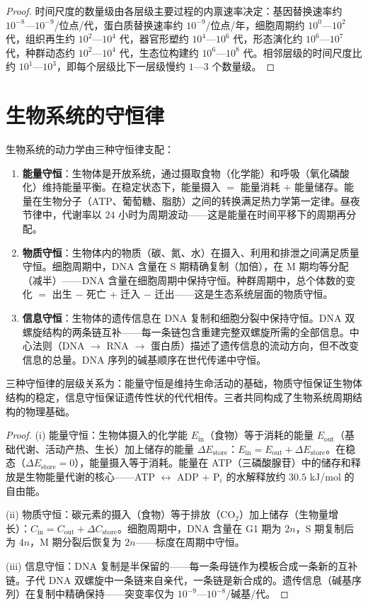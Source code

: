 \begin{proof}
时间尺度的数量级由各层级主要过程的内禀速率决定：基因替换速率约 $10^{-8}$—$10^{-9}$/位点/代，蛋白质替换速率约 $10^{-9}$/位点/年，细胞周期约 $10^0$—$10^2$ 代，组织再生约 $10^2$—$10^4$ 代，器官形塑约 $10^4$—$10^6$ 代，形态演化约 $10^6$—$10^7$ 代，种群动态约 $10^2$—$10^4$ 代，生态位构建约 $10^6$—$10^8$ 代。相邻层级的时间尺度比约 $10^1$—$10^3$，即每个层级比下一层级慢约 $1$—$3$ 个数量级。
\end{proof}

\section{生物系统的守恒律}

\begin{theorem}[生物系统的三种守恒律]\label{thm:biological_conservation}
生物系统的动力学由三种守恒律支配：
\begin{enumerate}[label=(\roman*)]
    \item \textbf{能量守恒}：生物体是开放系统，通过摄取食物（化学能）和呼吸（氧化磷酸化）维持能量平衡。在稳定状态下，能量摄入 $=$ 能量消耗 $+$ 能量储存。能量在生物分子（ATP、葡萄糖、脂肪）之间的转换满足热力学第一定律。昼夜节律中，代谢率以 $24$ 小时为周期波动——这是能量在时间平移下的周期再分配。
    \item \textbf{物质守恒}：生物体内的物质（碳、氮、水）在摄入、利用和排泄之间满足质量守恒。细胞周期中，DNA 含量在 S 期精确复制（加倍），在 M 期均等分配（减半）——DNA 含量在细胞周期中保持守恒。种群周期中，总个体数的变化 $=$ 出生 $-$ 死亡 $+$ 迁入 $-$ 迁出——这是生态系统层面的物质守恒。
    \item \textbf{信息守恒}：生物体的遗传信息在 DNA 复制和细胞分裂中保持守恒。DNA 双螺旋结构的两条链互补——每一条链包含重建完整双螺旋所需的全部信息。中心法则（DNA $\to$ RNA $\to$ 蛋白质）描述了遗传信息的流动方向，但不改变信息的总量。DNA 序列的碱基顺序在世代传递中守恒。
\end{enumerate}
三种守恒律的层级关系为：能量守恒是维持生命活动的基础，物质守恒保证生物体结构的稳定，信息守恒保证遗传性状的代代相传。三者共同构成了生物系统周期结构的物理基础。
\end{theorem}

\begin{proof}
(i) 能量守恒：生物体摄入的化学能 $E_{\text{in}}$（食物）等于消耗的能量 $E_{\text{out}}$（基础代谢、活动产热、生长）加上储存的能量 $\Delta E_{\text{store}}$：$E_{\text{in}} = E_{\text{out}} + \Delta E_{\text{store}}$。在稳态（$\Delta E_{\text{store}} = 0$），能量摄入等于消耗。能量在 ATP（三磷酸腺苷）中的储存和释放是生物能量代谢的核心——ATP $\leftrightarrow$ ADP $+$ P$_i$ 的水解释放约 $30.5$ kJ/mol 的自由能。

(ii) 物质守恒：碳元素的摄入（食物）等于排放（CO$_2$）加上储存（生物量增长）：$C_{\text{in}} = C_{\text{out}} + \Delta C_{\text{store}}$。细胞周期中，DNA 含量在 G1 期为 $2n$，S 期复制后为 $4n$，M 期分裂后恢复为 $2n$——标度在周期中守恒。

(iii) 信息守恒：DNA 复制是半保留的——每一条母链作为模板合成一条新的互补链。子代 DNA 双螺旋中一条链来自亲代，一条链是新合成的。遗传信息（碱基序列）在复制中精确保持——突变率仅为 $10^{-9}$—$10^{-8}$/碱基/代。
\end{proof}

